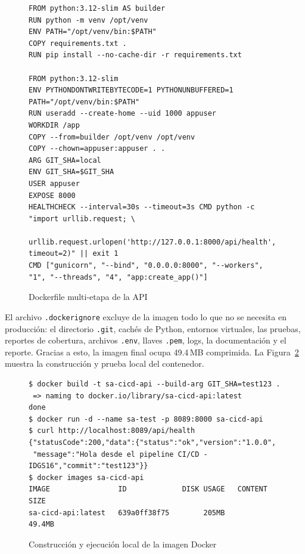 \documentclass[12pt,letterpaper]{article}
\begin{document}
\begin{figure}[H]
\centering
\begin{minipage}{0.95\textwidth}
\begin{lstlisting}
FROM python:3.12-slim AS builder
RUN python -m venv /opt/venv
ENV PATH="/opt/venv/bin:$PATH"
COPY requirements.txt .
RUN pip install --no-cache-dir -r requirements.txt

FROM python:3.12-slim
ENV PYTHONDONTWRITEBYTECODE=1 PYTHONUNBUFFERED=1 PATH="/opt/venv/bin:$PATH"
RUN useradd --create-home --uid 1000 appuser
WORKDIR /app
COPY --from=builder /opt/venv /opt/venv
COPY --chown=appuser:appuser . .
ARG GIT_SHA=local
ENV GIT_SHA=$GIT_SHA
USER appuser
EXPOSE 8000
HEALTHCHECK --interval=30s --timeout=3s CMD python -c "import urllib.request; \
  urllib.request.urlopen('http://127.0.0.1:8000/api/health', timeout=2)" || exit 1
CMD ["gunicorn", "--bind", "0.0.0.0:8000", "--workers", "1", "--threads", "4", "app:create_app()"]
\end{lstlisting}
\end{minipage}
\caption{Dockerfile multi-etapa de la API}
\label{fig:dockerfile}
\end{figure}

El archivo \texttt{.dockerignore} excluye de la imagen todo lo que no se necesita en producción:
el directorio \texttt{.git}, cachés de Python, entornos virtuales, las pruebas, reportes de
cobertura, archivos \texttt{.env}, llaves \texttt{.pem}, logs, la documentación y el reporte.
Gracias a esto, la imagen final ocupa 49.4\,MB comprimida. La Figura~\ref{fig:dockerlocal} muestra
la construcción y prueba local del contenedor.

\begin{figure}[H]
\centering
\begin{minipage}{0.95\textwidth}
\begin{lstlisting}[style=term]
$ docker build -t sa-cicd-api --build-arg GIT_SHA=test123 .
 => naming to docker.io/library/sa-cicd-api:latest                    done
$ docker run -d --name sa-test -p 8089:8000 sa-cicd-api
$ curl http://localhost:8089/api/health
{"statusCode":200,"data":{"status":"ok","version":"1.0.0",
 "message":"Hola desde el pipeline CI/CD - IDGS16","commit":"test123"}}
$ docker images sa-cicd-api
IMAGE                ID             DISK USAGE   CONTENT SIZE
sa-cicd-api:latest   639a0ff38f75        205MB         49.4MB
\end{lstlisting}
\end{minipage}
\caption{Construcción y ejecución local de la imagen Docker}
\label{fig:dockerlocal}
\end{figure}
\end{document}

